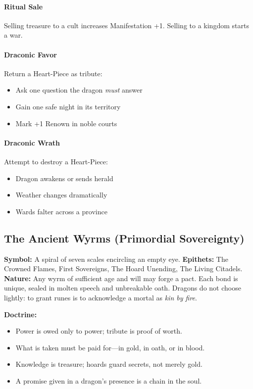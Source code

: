 \documentclass[11pt,letterpaper]{article}
\begin{document}
\paragraph{Ritual Sale}
Selling treasure to a cult increases Manifestation +1. Selling to a kingdom starts a war.

\paragraph{Draconic Favor}
Return a Heart-Piece as tribute:
\begin{itemize}[leftmargin=*]
\item Ask one question the dragon \textit{must} answer
\item Gain one safe night in its territory
\item Mark +1 Renown in noble courts
\end{itemize}

\paragraph{Draconic Wrath}
Attempt to destroy a Heart-Piece:
\begin{itemize}[leftmargin=*]
\item Dragon awakens or sends herald
\item Weather changes dramatically
\item Wards falter across a province
\end{itemize}

\subsection*{The Ancient Wyrms (Primordial Sovereignty)}
\label{subsec:patron-wyrms}

\textbf{Symbol:} A spiral of seven scales encircling an empty eye.  
\textbf{Epithets:} The Crowned Flames, First Sovereigns, The Hoard Unending, The Living Citadels.  
\textbf{Nature:} Any wyrm of sufficient age and will may forge a pact. Each bond is unique, sealed in molten speech and unbreakable oath. Dragons do not choose lightly: to grant runes is to acknowledge a mortal as \emph{kin by fire}.

\medskip

\textbf{Doctrine:}
\begin{itemize}[leftmargin=*]
\item Power is owed only to power; tribute is proof of worth.
\item What is taken must be paid for---in gold, in oath, or in blood.
\item Knowledge is treasure; hoards guard secrets, not merely gold.
\item A promise given in a dragon's presence is a chain in the soul.
\end{itemize}
\end{document}
